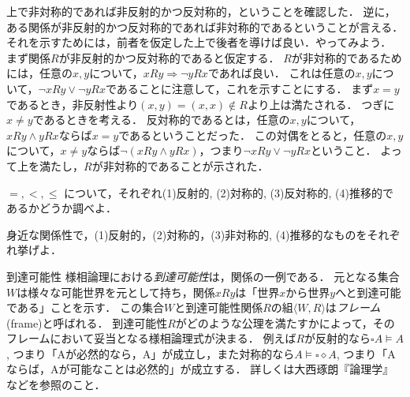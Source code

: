 \documentclass[dvipdfmx, 11pt,a4paper]{jsarticle}
\begin{document}
上で非対称的であれば非反射的かつ反対称的，ということを確認した．
逆に，ある関係が非反射的かつ反対称的であれば非対称的であるということが言える．
それを示すためには，前者を仮定した上で後者を導けば良い．やってみよう．
まず関係$R$が非反射的かつ反対称的であると仮定する．
$R$が非対称的であるためには，任意の$x,y$について，$xRy \Rightarrow \neg yRx$であれば良い．
これは任意の$x,y$について，$\neg xRy \vee \neg yRx$であることに注意して，これを示すことにする．
まず$x=y$であるとき，非反射性より$(x,y) = (x,x) \not\in R$より上は満たされる．
つぎに$x\neq y$であるときを考える．
反対称的であるとは，任意の$x,y$について，$xRy \wedge yRx$ならば$x=y$であるということだった．
この対偶をとると，任意の$x,y$について，$x\neq y$ならば$\neg (xRy \wedge yRx)$，つまり$\neg xRy \vee \neg yRx$ということ．
よって上を満たし，$R$が非対称的であることが示された．



\begin{renshu}{}{}
 $=, <, \leq$ について，それぞれ(1)反射的, (2)対称的, (3)反対称的, (4)推移的であるかどうか調べよ．
\end{renshu}


\begin{renshu}{}{}
身近な関係性で，(1)反射的，(2)対称的，(3)非対称的, (4)推移的なものをそれぞれ挙げよ．
\end{renshu}



\begin{rei}{到達可能性}{}
様相論理における\emph{到達可能性}は，関係の一例である．
元となる集合$W$は様々な可能世界を元として持ち，関係$xRy$は「世界$x$から世界$y$へと到達可能である」ことを示す．
この集合$W$と到達可能性関係$R$の組$\langle W, R \rangle$は\emph{フレーム}(frame)と呼ばれる．
到達可能性$R$がどのような公理を満たすかによって，そのフレームにおいて妥当となる様相論理式が決まる．
例えば$R$が反射的なら$\square A \models A$, つまり「Aが必然的なら，A」が成立し，また対称的なら$A \models \square \diamond A$, つまり「Aならば，Aが可能なことは必然的」が成立する．
詳しくは大西琢朗『論理学』などを参照のこと．
\end{rei}
\end{document}
